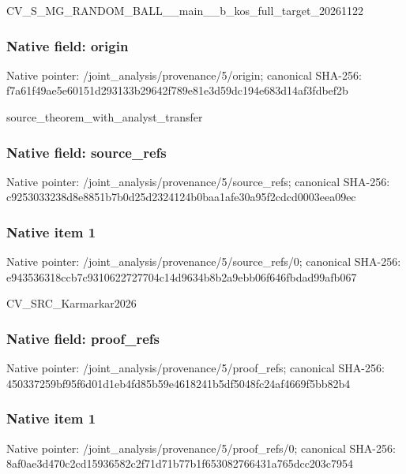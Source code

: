 \documentclass[10pt,a4paper]{article}
\begin{document}
CV\_S\_MG\_RANDOM\_BALL\_\_mai\allowbreak{}n\_\_b\_kos\_full\_target\_202\allowbreak{}61122


\subsubsection{Native field: origin}


Native pointer: /joint\_analysis/provenance/5/origin; canonical SHA-256: f7a61f49ae5e60151d293133\allowbreak{}b29642f789e81e3d59dc194e\allowbreak{}683d14af3fdbef2b


source\_theorem\_with\_analyst\_transfer


\subsubsection{Native field: source\_refs}


Native pointer: /joint\_analysis/provenan\allowbreak{}ce/5/source\_refs; canonical SHA-256: c9253033238d8e8851b7b0d2\allowbreak{}5d2324124b0baa1afe30a95f\allowbreak{}2cdcd0003eea09ec



\subsubsection{Native item 1}


Native pointer: /joint\_analysis/provenan\allowbreak{}ce/5/source\_refs/0; canonical SHA-256: e943536318ccb7c931062272\allowbreak{}7704c14d9634b8b2a9ebb06f\allowbreak{}646fbdad99afb067


CV\_SRC\_Karmarkar2026


\subsubsection{Native field: proof\_refs}


Native pointer: /joint\_analysis/provenance/5/proof\_refs; canonical SHA-256: 450337259bf95f6d01d1eb4f\allowbreak{}d85b59e4618241b5df5048fc\allowbreak{}24af4669f5bb82b4



\subsubsection{Native item 1}


Native pointer: /joint\_analysis/provenan\allowbreak{}ce/5/proof\_refs/0; canonical SHA-256: 8af0ae3d470c2cd15936582c\allowbreak{}2f71d71b77b1f65308276643\allowbreak{}1a765dcc203c7954
\end{document}
